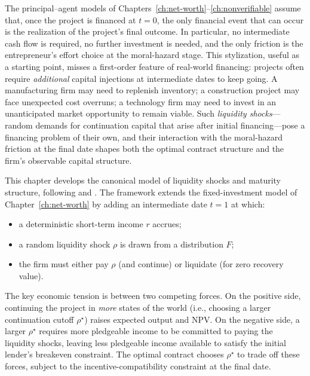 \documentclass[11pt,a4paper,oneside]{book}
\theoremstyle{plain}
\theoremstyle{definition}
\theoremstyle{remark}
\numberwithin{equation}{chapter}
\begin{document}
The principal--agent models of Chapters~\ref{ch:net-worth}--\ref{ch:nonverifiable} assume that, once the project is financed at $t=0$, the only financial event that can occur is the realization of the project's final outcome.
In particular, no intermediate cash flow is required, no further investment is needed, and the only friction is the entrepreneur's effort choice at the moral-hazard stage.
This stylization, useful as a starting point, misses a first-order feature of real-world financing: projects often require \emph{additional} capital injections at intermediate dates to keep going.
A manufacturing firm may need to replenish inventory; a construction project may face unexpected cost overruns; a technology firm may need to invest in an unanticipated market opportunity to remain viable.
Such \emph{liquidity shocks}---random demands for continuation capital that arise after initial financing---pose a financing problem of their own, and their interaction with the moral-hazard friction at the final date shapes both the optimal contract structure and the firm's observable capital structure.

This chapter develops the canonical model of liquidity shocks and maturity structure, following \citet{HolmstromTirole2000} and \citet{HolmstromTirole1998}.
The framework extends the fixed-investment model of Chapter~\ref{ch:net-worth} by adding an intermediate date $t=1$ at which:
\begin{itemize}
  \item a deterministic short-term income $r$ accrues;
  \item a random liquidity shock $\rho$ is drawn from a distribution $F$;
  \item the firm must either pay $\rho$ (and continue) or liquidate (for zero recovery value).
\end{itemize}
The key economic tension is between two competing forces.
On the positive side, continuing the project in \emph{more} states of the world (i.e., choosing a larger continuation cutoff $\rho^\star$) raises expected output and NPV.
On the negative side, a larger $\rho^\star$ requires more pledgeable income to be committed to paying the liquidity shocks, leaving less pledgeable income available to satisfy the initial lender's breakeven constraint.
The optimal contract chooses $\rho^\star$ to trade off these forces, subject to the incentive-compatibility constraint at the final date.
\end{document}
